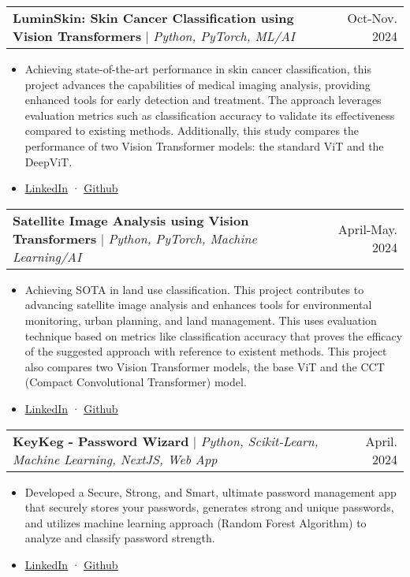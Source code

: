 \documentclass[letter paper, 15pt]{article}
\makeatletter
\newcommand{\resumeItem}[1]{
  \item\small{
    {#1 \vspace{-2pt}}
  }
}
\newcommand{\resumeProjectHeading}[2]{
    \item
    \begin{tabular*}{0.97\textwidth}{l@{\extracolsep{\fill}}r}
      \small#1 & #2 \\
    \end{tabular*}\vspace{-7pt}
}
\newcommand{\resumeItemListStart}{\begin{itemize}}
\newcommand{\resumeItemListEnd}{\end{itemize}\vspace{-5pt}}
\makeatother
\begin{document}
        \resumeProjectHeading
        {\textbf{LuminSkin: Skin Cancer Classification using Vision Transformers} $|$ \footnotesize\emph{Python, PyTorch, ML/AI}}{Oct-Nov. 2024}
        \resumeItemListStart
            \resumeItem{Achieving state-of-the-art performance in skin cancer classification, this project advances the capabilities of medical imaging analysis, providing enhanced tools for early detection and treatment. The approach leverages evaluation metrics such as classification accuracy to validate its effectiveness compared to existing methods. Additionally, this study compares the performance of two Vision Transformer models: the standard ViT and the DeepViT.}
            \resumeItem{\href{https://www.linkedin.com/posts/manavvgarg_github-manavvgargluminskin-the-goal-of-activity-7273150358258888704-gHjF?utm_source=share&utm_medium=member_desktop}{\underline{\faIcon{linkedin} LinkedIn}} · \href{https://github.com/manavvgarg/LuminSkin}{\underline{\faIcon{github} Github}}}
        \resumeItemListEnd
        
        \resumeProjectHeading
        {\textbf{Satellite Image Analysis using Vision Transformers} $|$ \footnotesize\emph{Python, PyTorch,  Machine Learning/AI}}{April-May. 2024}
        \resumeItemListStart
            \resumeItem{Achieving SOTA in land use classification. This project contributes to advancing satellite image analysis and enhances tools for environmental monitoring, urban planning, and land management. This uses evaluation technique based on metrics like classification accuracy that proves the efficacy of the suggested approach with reference to existent methods. This project also compares two Vision Transformer models, the base ViT and the CCT (Compact Convolutional Transformer) model.}
            \resumeItem{\href{https://www.linkedin.com/posts/manavvgarg_viteurosat-activity-7197334551373729792-Trxo?utm_source=share&utm_medium=member_desktop}{\underline{\faIcon{linkedin} LinkedIn}} · \href{https://github.com/manavvgarg/STIA_ViT}{\underline{\faIcon{github} Github}}}
        \resumeItemListEnd

    
        \resumeProjectHeading
        {\textbf{KeyKeg - Password Wizard} $|$ \footnotesize\emph{Python, Scikit-Learn, Machine Learning, NextJS, Web App}}{April. 2024}
        \resumeItemListStart
            \resumeItem{Developed a Secure, Strong, and Smart, ultimate password management app that securely stores your passwords, generates strong and unique passwords, and utilizes machine learning approach (Random Forest Algorithm) to analyze and classify password strength.}
            \resumeItem{\href{https://www.linkedin.com/posts/manavvgarg_keykeg-passwordwizard-ai-activity-7183745702341087232-TmX4?utm_source=share&utm_medium=member_desktop}{\underline{\faIcon{linkedin} LinkedIn}} · \href{https://github.com/manavvgarg/keykeg}{\underline{\faIcon{github} Github}}}
        \resumeItemListEnd
        
\end{document}
